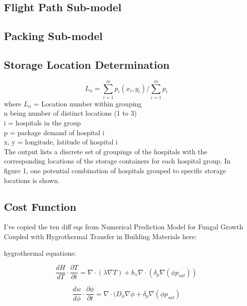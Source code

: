\documentclass[12pt]{article}
\begin{document}
\begin{multicols}{2}
\subsection{Flight Path Sub-model}
\lipsum[3]

\subsection{Packing Sub-model}
\lipsum[4]

\subsection{Storage Location Determination}
\lipsum[5]
\[ 
L_n = \sum_{i=1}^{m} p_i(x_i, y_i) / \sum_{i=1}^{m} p_i 
\]
where $L_n$ = Location number within grouping \\
n being number of distinct locations (1 to 3) \\
i = hospitals in the group \\
p = package demand of hospital i \\
x, y = longitude, latitude of hospital i \\
The output lists a discrete set of groupings of the hospitals with the corresponding locations of the storage containers for each hospital group. In figure 1, one potential combination of hospitals grouped to specific storage locations is shown. 



\subsection{Cost Function}
I've copied the ten diff eqs from Numerical Prediction Model for Fungal Growth Coupled with Hygrothermal Transfer in Building Materials here:

hygrothermal equations:

\begin{equation}
\frac{dH}{dT}\cdot\frac{\partial T}{\partial t}=\nabla\cdot(\lambda\nabla T)+h_v\nabla\cdot(\delta_{p}\nabla(\phi p_{sat}))
\end{equation}

\begin{equation}
\frac{dw}{d\phi}\cdot\frac{\partial \phi}{\partial t}=\nabla\cdot(D_{\phi}\nabla\phi+\delta_{p}\nabla(\phi p_{sat})
\end{equation}


\end{multicols}
\end{document}
